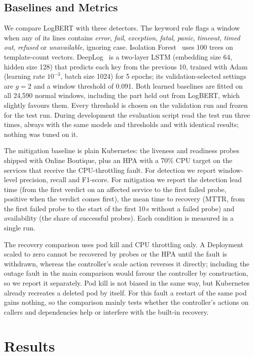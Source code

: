 \documentclass[journal]{IEEEtran}
\begin{document}
\subsection{Baselines and Metrics}
We compare LogBERT with three detectors. The keyword rule flags a window when any of its lines contains \emph{error}, \emph{fail}, \emph{exception}, \emph{fatal}, \emph{panic}, \emph{timeout}, \emph{timed out}, \emph{refused} or \emph{unavailable}, ignoring case. Isolation Forest~\cite{liu2008} uses 100 trees on template-count vectors. DeepLog~\cite{du2017} is a two-layer LSTM (embedding size 64, hidden size 128) that predicts each key from the previous 10, trained with Adam (learning rate $10^{-3}$, batch size 1024) for 5 epochs; its validation-selected settings are $g = 2$ and a window threshold of 0.091. Both learned baselines are fitted on all 24,590 normal windows, including the part held out from LogBERT, which slightly favours them. Every threshold is chosen on the validation run and frozen for the test run. During development the evaluation script read the test run three times, always with the same models and thresholds and with identical results; nothing was tuned on it.

The mitigation baseline is plain Kubernetes: the liveness and readiness probes shipped with Online Boutique, plus an HPA with a 70\% CPU target on the services that receive the CPU-throttling fault. For detection we report window-level precision, recall and F1-score. For mitigation we report the detection lead time (from the first verdict on an affected service to the first failed probe, positive when the verdict comes first), the mean time to recovery (MTTR, from the first failed probe to the start of the first 10\,s without a failed probe) and availability (the share of successful probes). Each condition is measured in a single run.

The recovery comparison uses pod kill and CPU throttling only. A Deployment scaled to zero cannot be recovered by probes or the HPA until the fault is withdrawn, whereas the controller's scale action reverses it directly; including the outage fault in the main comparison would favour the controller by construction, so we report it separately. Pod kill is not biased in the same way, but Kubernetes already recreates a deleted pod by itself. For this fault a restart of the same pod gains nothing, so the comparison mainly tests whether the controller's actions on callers and dependencies help or interfere with the built-in recovery.

\section{Results}\label{sec:results}
\end{document}
